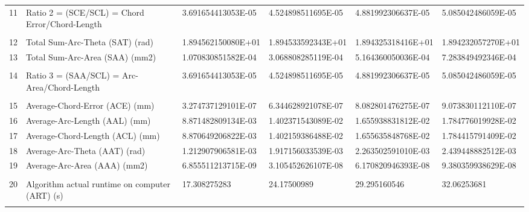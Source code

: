 \begin{landscape}
\begin{table}[ht]
{\begin{tabular}{ p{0.2cm} p{8.80cm} p{4.00cm} p{4.0cm} p{4.00cm} p{4.0cm}}
	11	&	Ratio 2 = (SCE/SCL) = Chord Error/Chord-Length	&	3.691654413053E-05	&	4.524898511695E-05	&	4.881992306637E-05	&	5.085042486059E-05	\\
	&		&		&		&		&		\\
	12	&	Total Sum-Arc-Theta (SAT) (rad)	&	1.894562150080E+01	&	1.894533592343E+01	&	1.894325318416E+01	&	1.894232057270E+01	\\
	13	&	Total Sum-Arc-Area (SAA) (mm2)	&	1.070830851582E-04	&	3.068808285119E-04	&	5.164360050036E-04	&	7.283849492346E-04	\\
	&		&		&		&		&		\\
	14	&	Ratio 3 = (SAA/SCL) = Arc-Area/Chord-Length	&	3.691654413053E-05	&	4.524898511695E-05	&	4.881992306637E-05	&	5.085042486059E-05	\\
	&		&		&		&		&		\\
	15	&	Average-Chord-Error (ACE) (mm)	&	3.274737129101E-07	&	6.344628921078E-07	&	8.082801476275E-07	&	9.073830112110E-07	\\
	16	&	Average-Arc-Length (AAL) (mm)	&	8.871482809134E-03	&	1.402371543089E-02	&	1.655938831812E-02	&	1.784776019928E-02	\\
	17	&	Average-Chord-Length (ACL) (mm)	&	8.870649206822E-03	&	1.402159386488E-02	&	1.655635848768E-02	&	1.784415791409E-02	\\
	18	&	Average-Arc-Theta (AAT) (rad)	&	1.212907906581E-03	&	1.917156033539E-03	&	2.263502591010E-03	&	2.439448882512E-03	\\
	19	&	Average-Arc-Area (AAA) (mm2)	&	6.855511213715E-09	&	3.105452626107E-08	&	6.170820946393E-08	&	9.380359938629E-08	\\
	&		&		&		&		&		\\
	20	&	Algorithm actual runtime on computer (ART) (s) 	&	17.308275283	&	24.17500989	&	29.295160546	&	32.06253681	\\
	&		&		&		&		&		\\
	\hline
	
\end{tabular}
			
}   %
		
\end{table}
\end{landscape}

\clearpage
\pagebreak
